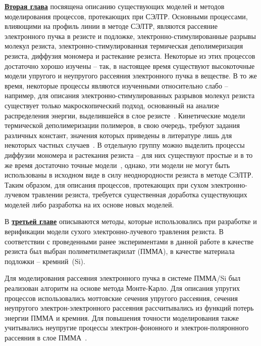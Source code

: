 \underline{\textbf{Вторая глава}} посвящена описанию существующих моделей и методов моделирования процессов, протекающих при СЭЛТР.
Основными процессами, влияющими на профиль линии в методе СЭЛТР, являются рассеяние электронного пучка в резисте и подложке, электронно-стимулированные разрывы молекул резиста, электронно-стимулированная термическая деполимеризация резиста, диффузия мономера и растекание резиста.
Некоторые из этих процессов достаточно хорошо изучены -- так, в настоящее время существуют высокоточные модели упругого и неупругого рассеяния электронного пучка в веществе.
В то же время, некоторые процессы являются изученными относительно слабо -- например, для описания электронно-стимулированных разрывов молекул резиста существует только макроскопический подход, основанный на анализе распределения энергии, выделившейся в слое резисте~\cite{Greeneich1979_Mf_Mn}.
Кинетические модели термической деполимеризации полимеров, в свою очередь, требуют задания различных констант, значения которых приведены в литературе лишь для некоторых частных случаев~\cite{Boyd_3, Mita_PMMA_zip_lengths_T}.
В отдельную группу можно выделить процессы диффузии мономера и растекания резиста -- для них существуют простые и в то же время достаточно точные модели~\cite{Fragala_3_diffusion, Leveder_2010, Kirchner_reflow}, однако, эти модели не могут быть использованы в исходном виде в силу неоднородности резиста в методе СЭЛТР.
Таким образом, для описания процессов, протекающих при сухом электронно-лучевом травлении резиста, требуется существенная доработка существующих моделей либо разработка на их основе новых моделей.

В \underline{\textbf{третьей главе}} описываются методы, которые использовались при разработке и верификации модели сухого электронно-лучевого травления резиста.
В соответствии с проведенными ранее экспериментами в данной работе в качестве резиста был выбран полиметилметакрилат (ПММА), в качестве материала подложки -- кремний~(Si).

Для моделирования рассеяния электронного пучка в системе ПММА/Si был реализован алгоритм на основе метода Монте-Карло. Для описания упругих процессов использовались моттовские сечения упругого рассеяния, сечения неупругого электрон-электронного рассеяния рассчитывались из функций потерь энергии ПММА и кремния.
Для повышения точности моделирования также учитывались неупругие процессы электрон-фононного и электрон-поляронного рассеяния в слое ПММА~\cite{Ciappa_2010}.


